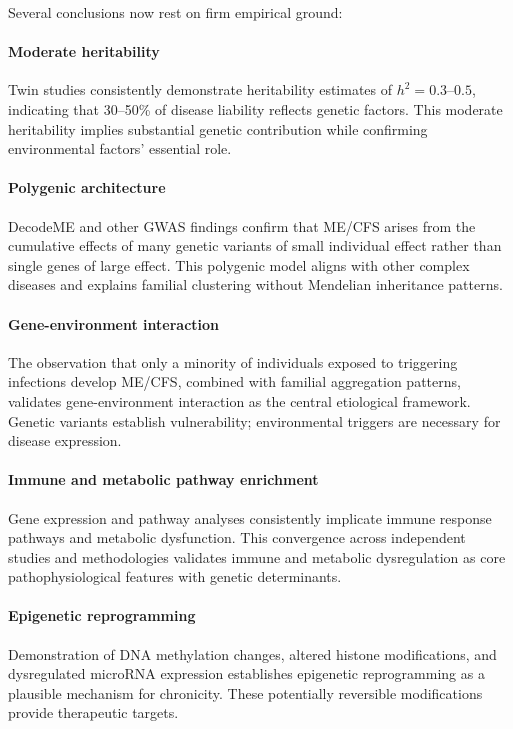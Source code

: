 \begin{achievement}
\label{ach:genetic-epigenetic-foundations}
Several conclusions now rest on firm empirical ground:

\paragraph{Moderate heritability} Twin studies consistently demonstrate heritability estimates of $h^2 = 0.3$--$0.5$, indicating that 30--50\% of disease liability reflects genetic factors. This moderate heritability implies substantial genetic contribution while confirming environmental factors' essential role.

\paragraph{Polygenic architecture} DecodeME and other GWAS findings confirm that ME/CFS arises from the cumulative effects of many genetic variants of small individual effect rather than single genes of large effect. This polygenic model aligns with other complex diseases and explains familial clustering without Mendelian inheritance patterns.

\paragraph{Gene-environment interaction} The observation that only a minority of individuals exposed to triggering infections develop ME/CFS, combined with familial aggregation patterns, validates gene-environment interaction as the central etiological framework. Genetic variants establish vulnerability; environmental triggers are necessary for disease expression.

\paragraph{Immune and metabolic pathway enrichment} Gene expression and pathway analyses consistently implicate immune response pathways and metabolic dysfunction. This convergence across independent studies and methodologies validates immune and metabolic dysregulation as core pathophysiological features with genetic determinants.

\paragraph{Epigenetic reprogramming} Demonstration of DNA methylation changes, altered histone modifications, and dysregulated microRNA expression establishes epigenetic reprogramming as a plausible mechanism for chronicity. These potentially reversible modifications provide therapeutic targets.
\end{achievement}

